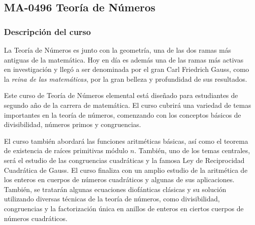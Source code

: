 \newpage
\subsection*{MA-0496 Teoría de Números}

\hypertarget{MA0496}{}
\begin{refsection}
\begin{table}[H]
\end{table}



\subsubsection*{Descripción del curso}

La Teoría de Números es junto con la geometría, una de las dos ramas más antiguas de la matemática. Hoy en día es además una de las ramas más activas en investigación y llegó a ser denominada por el gran Carl Friedrich Gauss, como la \textit{reina de las matemáticas}, por la gran belleza y profundidad de sus resultados.

Este curso de Teoría de Números elemental está diseñado para estudiantes de segundo año de la carrera de matemática. El curso cubrirá una variedad de temas importantes en la teoría de números, comenzando con los conceptos básicos de divisibilidad, números primos y congruencias.

El curso también abordará las funciones aritméticas básicas, así como el teorema de existencia de raíces primitivas módulo $n$. También, uno de los temas centrales, será el estudio de las congruencias cuadráticas y la famosa Ley de Reciprocidad Cuadrática de Gauss. El curso finaliza con un amplio estudio de la aritmética de los enteros en cuerpos de números cuadráticos y algunas de sus aplicaciones. También, se tratarán algunas ecuaciones diofánticas clásicas y su solución utilizando diversas técnicas de la teoría de números, como divisibilidad, congruencias y la factorización única en anillos de enteros en ciertos cuerpos de números cuadráticos.


\end{refsection}
